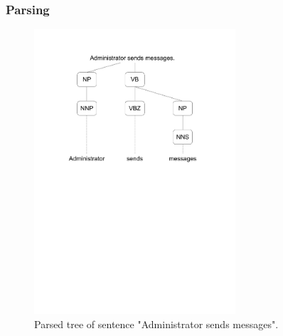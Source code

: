 \subsubsection{Parsing}

\begin{figure}[h]
  \centering
  \includegraphics[height=300pt]{images/ParsedTree}
  \caption{Parsed tree of sentence "Administrator sends messages".}
  \label{fig:ParsedTree}
\end{figure}

